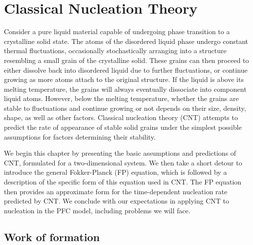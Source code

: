 \chapter{\sf Classical Nucleation Theory}\label{ch:nucleation}


Consider a pure liquid material capable of undergoing phase transition to a crystalline solid state. The atoms of the disordered liquid phase undergo constant thermal fluctuations, occasionally stochastically arranging into a structure resembling a small grain of the crystalline solid. These grains can then proceed to either dissolve back into disordered liquid due to further fluctuations, or continue growing as more atoms attach to the original structure. If the liquid is above its melting temperature, the grains will always eventually dissociate into component liquid atoms. However, below the melting temperature, whether the grains are stable to fluctuations and continue growing or not depends on their size, density, shape, as well as other factors. Classical nucleation theory (CNT) \cite{hoyt_phasetransf,sear07} attempts to predict the rate of appearance of stable solid grains under the simplest possible assumptions for factors determining their stability.

We begin this chapter by presenting the basic assumptions and predictions of CNT, formulated for a two-dimensional system. We then take a short detour to introduce the general Fokker-Planck (FP) equation, which is followed by a description of the specific form of this equation used in CNT. The FP equation then provides an approximate form for the time-dependent nucleation rate predicted by CNT. We conclude with our expectations in applying CNT to nucleation in the PFC model, including problems we will face.




\section{Work of formation}\label{sec:nuc_work}

